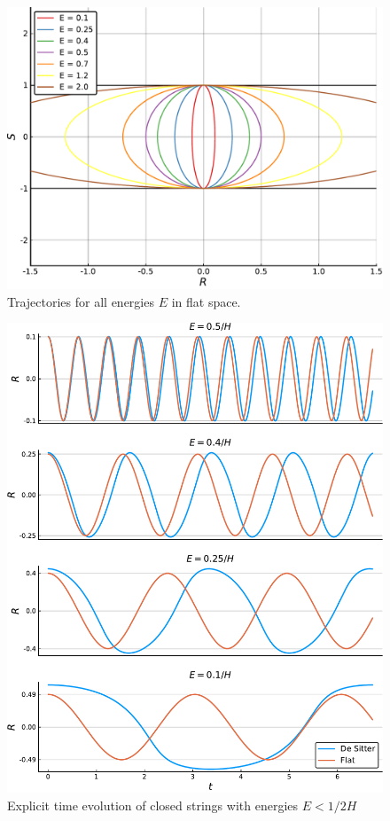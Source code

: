 \begin{figure}
    \centering
    \includegraphics[width = 0.93 \linewidth]{Pictures/Flat_closed.pdf}
    \caption{Trajectories for all energies $E$ in flat space.}
    \label{fig:flat_closed}
\end{figure}

\begin{figure}
    \centering
    \includegraphics[width = 1.0 \linewidth]{Pictures/Time_dep.pdf}
    \caption{Explicit time evolution of closed strings with energies $E < 1/2H$}
    \label{fig:desiter_time_depend}
\end{figure}

